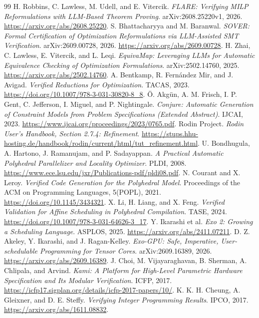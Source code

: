 \documentclass[11pt]{article}
\begin{document}
\begin{thebibliography}{99}
 H. Robbins, C. Lawless, M. Udell, and E. Vitercik. \emph{FLARE: Verifying MILP Reformulations with LLM-Based Theorem Proving}. arXiv:2608.25220v1, 2026. \url{https://arxiv.org/abs/2608.25220}.
 S. Bhattacharyya and M. Baranwal. \emph{SOVER: Formal Certification of Optimization Reformulations via LLM-Assisted SMT Verification}. arXiv:2609.00728, 2026. \url{https://arxiv.org/abs/2609.00728}.
 H. Zhai, C. Lawless, E. Vitercik, and L. Leqi. \emph{EquivaMap: Leveraging LLMs for Automatic Equivalence Checking of Optimization Formulations}. arXiv:2502.14760, 2025. \url{https://arxiv.org/abs/2502.14760}.
 A. Bentkamp, R. Fern\'andez Mir, and J. Avigad. \emph{Verified Reductions for Optimization}. TACAS, 2023. \url{https://doi.org/10.1007/978-3-031-30820-8_8}.
 \"O. Akg\"un, A. M. Frisch, I. P. Gent, C. Jefferson, I. Miguel, and P. Nightingale. \emph{Conjure: Automatic Generation of Constraint Models from Problem Specifications (Extended Abstract)}. IJCAI, 2023. \url{https://www.ijcai.org/proceedings/2023/0765.pdf}.
 Rodin Project. \emph{Rodin User's Handbook, Section 2.7.4: Refinement}. \url{https://stups.hhu-hosting.de/handbook/rodin/current/html/tut_refinement.html}.
 U. Bondhugula, A. Hartono, J. Ramanujam, and P. Sadayappan. \emph{A Practical Automatic Polyhedral Parallelizer and Locality Optimizer}. PLDI, 2008. \url{https://www.ece.lsu.edu/jxr/Publications-pdf/pldi08.pdf}.
 N. Courant and X. Leroy. \emph{Verified Code Generation for the Polyhedral Model}. Proceedings of the ACM on Programming Languages, 5(POPL), 2021. \url{https://doi.org/10.1145/3434321}.
 X. Li, H. Liang, and X. Feng. \emph{Verified Validation for Affine Scheduling in Polyhedral Compilation}. TASE, 2024. \url{https://doi.org/10.1007/978-3-031-64626-3_17}.
 Y. Ikarashi et al. \emph{Exo 2: Growing a Scheduling Language}. ASPLOS, 2025. \url{https://arxiv.org/abs/2411.07211}.
 D. Z. Akeley, Y. Ikarashi, and J. Ragan-Kelley. \emph{Exo-GPU: Safe, Imperative, User-schedulable Programming for Tensor Cores}. arXiv:2609.16389, 2026. \url{https://arxiv.org/abs/2609.16389}.
 J. Choi, M. Vijayaraghavan, B. Sherman, A. Chlipala, and Arvind. \emph{Kami: A Platform for High-Level Parametric Hardware Specification and Its Modular Verification}. ICFP, 2017. \url{https://icfp17.sigplan.org/details/icfp-2017-papers/10/}.
 K. K. H. Cheung, A. Gleixner, and D. E. Steffy. \emph{Verifying Integer Programming Results}. IPCO, 2017. \url{https://arxiv.org/abs/1611.08832}.

\end{thebibliography}
\end{document}
